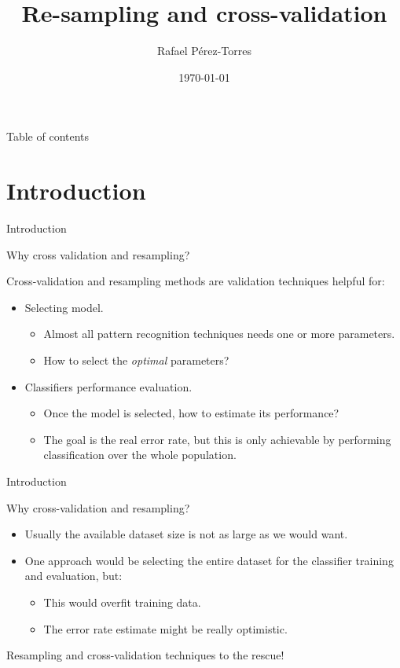 \documentclass[aspectratio=169]{beamer}
\author{Rafael Pérez-Torres}
\title{Re-sampling and cross-validation}
\institute{Cinvestav Tamaulipas}
\date{\today}
\begin{document}
\frame{\maketitle}
\begin{frame}{Table of contents}
	\tableofcontents
\end{frame}

\section{Introduction}
\begin{frame}{Introduction}

{\Large{} Why cross validation and resampling?} 

Cross-validation and resampling methods are validation techniques helpful for:
\begin{itemize}
	\item Selecting model.
	\begin{itemize}
		\item Almost all pattern recognition techniques needs one or more parameters.
		\item How to select the \emph{optimal} parameters?
	\end{itemize}
	\item Classifiers performance evaluation.
	\begin{itemize}
		\item Once the model is selected, how to estimate its performance?
		\item The goal is the real error rate, but this is only achievable by performing classification over the whole population.
	\end{itemize}
\end{itemize}
\end{frame}

\begin{frame}{Introduction}

{\Large{} Why cross-validation and resampling?} 

\begin{itemize}
	\item Usually the available dataset size is not as large as we would want.
	\item One approach would be selecting the entire dataset for the classifier training and evaluation, but:
	\begin{itemize}
		\item This would overfit training data.
		\item The error rate estimate might be really optimistic.
	\end{itemize}
\end{itemize}

{\Large{} Resampling and cross-validation techniques to the rescue!} 
\end{frame}
\end{document}
